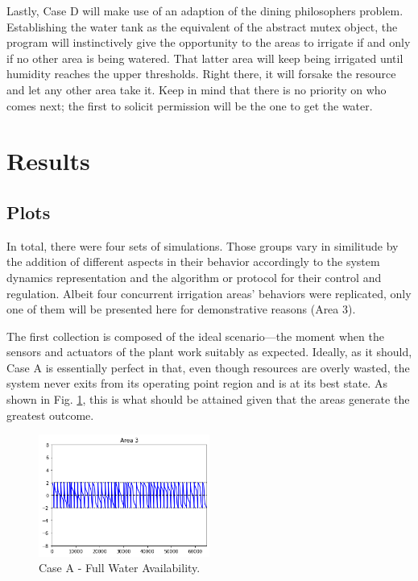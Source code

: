 \documentclass[12pt]{article}
\begin{document}
Lastly, Case D will make use of an adaption of the dining philosophers problem. Establishing the water tank as the equivalent of the abstract mutex object, the program will instinctively give the opportunity to the areas to irrigate if and only if no other area is being watered. That latter area will keep being irrigated until humidity reaches the upper thresholds. Right there, it will forsake the resource and let any other area take it. Keep in mind that there is no priority on who comes next; the first to solicit permission will be the one to get the water.

\section{Results}

\subsection{Plots}

In total, there were four sets of simulations. Those groups vary in similitude by the addition of different aspects in their behavior accordingly to the system dynamics representation and the algorithm or protocol for their control and regulation. Albeit four concurrent irrigation areas' behaviors were replicated, only one of them will be presented here for demonstrative reasons (Area 3).

The first collection is composed of the ideal scenario—the moment when the sensors and actuators of the plant work suitably as expected. Ideally, as it should, Case A is essentially perfect in that, even though resources are overly wasted, the system never exits from its operating point region and is at its best state. As shown in Fig. \ref{fig:case_a}, this is what should be attained given that the areas generate the greatest outcome.

\begin{figure}[ht]
\includegraphics[width=0.5\textwidth]{case_a}
\centering
\caption{Case A - Full Water Availability.}
\label{fig:case_a}
\end{figure}
\end{document}
